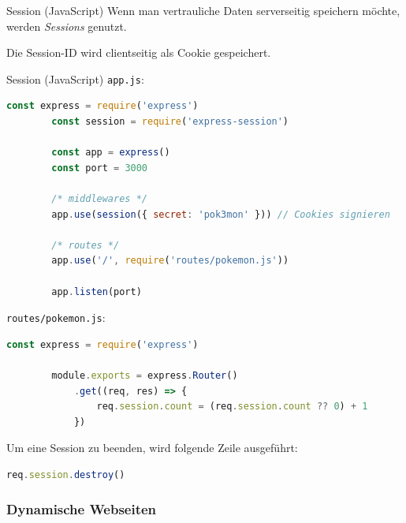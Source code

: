 \begin{defi}{Session (JavaScript)}
    Wenn man vertrauliche Daten serverseitig speichern möchte, werden \emph{Sessions} genutzt.

    Die Session-ID wird clientseitig als Cookie gespeichert.
\end{defi}

\begin{example}{Session (JavaScript)}
    \texttt{app.js}:
    \begin{lstlisting}[language=JavaScript]
        const express = require('express')
        const session = require('express-session')
        
        const app = express()
        const port = 3000

        /* middlewares */
        app.use(session({ secret: 'pok3mon' })) // Cookies signieren

        /* routes */
        app.use('/', require('routes/pokemon.js'))

        app.listen(port)
    \end{lstlisting}

    \texttt{routes/pokemon.js}:
    \begin{lstlisting}[language=JavaScript]
        const express = require('express')
        
        module.exports = express.Router()
            .get((req, res) => {
                req.session.count = (req.session.count ?? 0) + 1
            })
    \end{lstlisting}

    Um eine Session zu beenden, wird folgende Zeile ausgeführt:
    \begin{lstlisting}[language=JavaScript]
        req.session.destroy()
    \end{lstlisting}
\end{example}

\subsubsection{Dynamische Webseiten}


